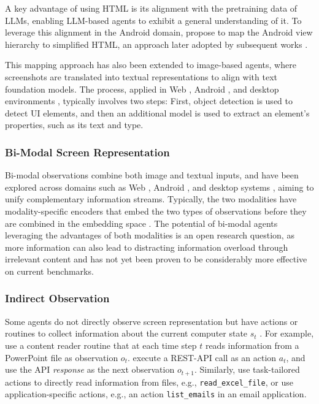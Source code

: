 A key advantage of using HTML is its alignment with the pretraining data of LLMs, enabling LLM-based agents to exhibit a general understanding of it. 
To leverage this alignment in the Android domain, \citet{wang_enabling_2023} propose to map the Android view hierarchy to simplified HTML, an approach later adopted by subsequent works .

This mapping approach has also been extended to image-based agents, where screenshots are translated into textual representations to align with text foundation models. The process, applied in Web , Android , and desktop environments , typically involves two steps: First, object detection is used to detect UI elements, and then an additional model is used to extract an element's properties, such as its text and type.


\subsubsection{Bi-Modal Screen Representation}\label{sec:obervation_space_bimodal}
Bi-modal observations combine both image and textual inputs, and have been explored across domains such as Web , Android , and desktop systems , aiming to unify complementary information streams.
Typically, the two modalities have modality-specific encoders that embed the two types of observations before they are combined in the embedding space .
The potential of bi-modal agents leveraging the advantages of both modalities is an open research question, as more information can also lead to distracting information overload through irrelevant content and has not yet been proven to be considerably more effective on current benchmarks.

\subsubsection{Indirect Observation}\label{sec:obervation_space_indirect}
Some agents do not directly observe screen representation but have actions or routines to collect information about the current computer state $s_t$ .
For example, \citet{guo_pptc_2024} use a content reader routine that at each time step $t$ reads information from a PowerPoint file as observation $o_t$.
\citet{song_restgpt_2023} execute a REST-API call as an action $a_t$, and use the API \emph{response} as the next observation $o_{t+1}$. %
Similarly, \citet{wang_officebench_2024} use task-tailored actions to directly read information from files, e.g., \texttt{read\_excel\_file}, or use application-specific actions, e.g., an action \texttt{list\_emails} in an email application.

